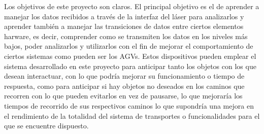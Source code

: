 
Los objetivos de este proyecto son claros. El principal objetivo es el de aprender a manejar los datos recibidos a través de la interfaz del láser para analizarlos y aprender también a manejar las transiciones de datos entre ciertos elementos harware, es decir, comprender como se transmiten los datos en los niveles más bajos, poder analizarlos y utilizarlos con el fin de mejorar el comportamiento de ciertos sistemas como pueden ser los AGVs.\hfill 
\break\break
Estos dispositivos pueden emplear el sistema desarrollado en este proyecto para anticipar tanto los objetos con los que desean interactuar, con lo que podría mejorar su funcionamiento o tiempo de respuesta, como para anticipar si hay objetos no deseados en los caminos que recorren con lo que pueden evitarlos en vez de pausarse, lo que mejoraría los tiempos de recorrido de sus respectivos caminos lo que supondría una mejora en el rendimiento de la totalidad del sistema de transportes o funcionalidades para el que se encuentre dispuesto.